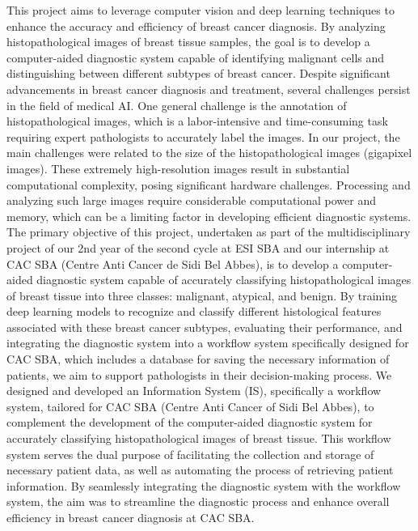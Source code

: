 \documentclass[
11pt, %
english, %
singlespacing, %
headsepline, %
]{project_structure}
\begin{document}
\noindent This project aims to leverage computer vision and deep learning techniques to enhance the accuracy and efficiency of breast cancer diagnosis. By analyzing histopathological images of breast tissue samples, the goal is to develop a computer-aided diagnostic system capable of identifying malignant cells and distinguishing between different subtypes of breast cancer.
Despite significant advancements in breast cancer diagnosis and treatment, several challenges persist in the field of medical AI. One general challenge is the annotation of histopathological images, which is a labor-intensive and time-consuming task requiring expert pathologists to accurately label the images. In our project, the main challenges were related to the size of the histopathological images (gigapixel images). These extremely high-resolution images result in substantial computational complexity, posing significant hardware challenges. Processing and analyzing such large images require considerable computational power and memory, which can be a limiting factor in developing efficient diagnostic systems.
The primary objective of this project, undertaken as part of the multidisciplinary project of our 2nd year of the second cycle at ESI SBA and our internship at CAC SBA (Centre Anti Cancer de Sidi Bel Abbes), is to develop a computer-aided diagnostic system capable of accurately classifying histopathological images of breast tissue into three classes: malignant, atypical, and benign. By training deep learning models to recognize and classify different histological features associated with these breast cancer subtypes, evaluating their performance, and integrating the diagnostic system into a workflow system specifically designed for CAC SBA, which includes a database for saving the necessary information of patients, we aim to support pathologists in their decision-making process. 
We designed and developed an Information System (\acrshort{IS}), specifically a workflow system, tailored for CAC SBA (Centre Anti Cancer of Sidi Bel Abbes), to complement the development of the computer-aided diagnostic system for accurately classifying histopathological images of breast tissue. This workflow system serves the dual purpose of facilitating the collection and storage of necessary patient data, as well as automating the process of retrieving patient information. By seamlessly integrating the diagnostic system with the workflow system, the aim was to streamline the diagnostic process and enhance overall efficiency in breast cancer diagnosis at CAC SBA.
\end{document}
